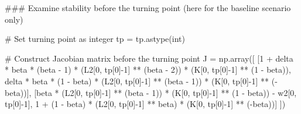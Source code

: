 \documentclass[
  letterpaper,
  DIV=11,
  numbers=noendperiod]{scrreprt}
\newenvironment{Shaded}{\begin{snugshade}}{\end{snugshade}}
\newcommand{\BuiltInTok}[1]{\textcolor[rgb]{0.00,0.23,0.31}{#1}}
\newcommand{\CommentTok}[1]{\textcolor[rgb]{0.37,0.37,0.37}{#1}}
\newcommand{\DecValTok}[1]{\textcolor[rgb]{0.68,0.00,0.00}{#1}}
\newcommand{\NormalTok}[1]{\textcolor[rgb]{0.00,0.23,0.31}{#1}}
\newcommand{\OperatorTok}[1]{\textcolor[rgb]{0.37,0.37,0.37}{#1}}
\begin{document}
\begin{tcolorbox}[enhanced jigsaw, titlerule=0mm, breakable, bottomrule=.15mm, toprule=.15mm, colbacktitle=quarto-callout-note-color!10!white, rightrule=.15mm, toptitle=1mm, opacityback=0, left=2mm, coltitle=black, title=\textcolor{quarto-callout-note-color}{\faInfo}\hspace{0.5em}{Python code}, colframe=quarto-callout-note-color-frame, opacitybacktitle=0.6, leftrule=.75mm, bottomtitle=1mm, arc=.35mm, colback=white]

\begin{Shaded}
\begin{Highlighting}[]
\CommentTok{\#\#\# Examine stability before the turning point (here for the baseline scenario only)}

\CommentTok{\# Set turning point as integer}
\NormalTok{tp }\OperatorTok{=}\NormalTok{ tp.astype(}\BuiltInTok{int}\NormalTok{)  }

\CommentTok{\# Construct Jacobian matrix before the turning point }
\NormalTok{J }\OperatorTok{=}\NormalTok{ np.array([}
\NormalTok{    [}\DecValTok{1} \OperatorTok{+}\NormalTok{ delta }\OperatorTok{*}\NormalTok{ beta }\OperatorTok{*}\NormalTok{ (beta }\OperatorTok{{-}} \DecValTok{1}\NormalTok{) }\OperatorTok{*}\NormalTok{ (L2[}\DecValTok{0}\NormalTok{, tp[}\DecValTok{0}\NormalTok{]}\OperatorTok{{-}}\DecValTok{1}\NormalTok{] }\OperatorTok{**}\NormalTok{ (beta }\OperatorTok{{-}} \DecValTok{2}\NormalTok{)) }\OperatorTok{*}\NormalTok{ (K[}\DecValTok{0}\NormalTok{, tp[}\DecValTok{0}\NormalTok{]}\OperatorTok{{-}}\DecValTok{1}\NormalTok{] }\OperatorTok{**}\NormalTok{ (}\DecValTok{1} \OperatorTok{{-}}\NormalTok{ beta)),}
\NormalTok{     delta }\OperatorTok{*}\NormalTok{ beta }\OperatorTok{*}\NormalTok{ (}\DecValTok{1} \OperatorTok{{-}}\NormalTok{ beta) }\OperatorTok{*}\NormalTok{ (L2[}\DecValTok{0}\NormalTok{, tp[}\DecValTok{0}\NormalTok{]}\OperatorTok{{-}}\DecValTok{1}\NormalTok{] }\OperatorTok{**}\NormalTok{ (beta }\OperatorTok{{-}} \DecValTok{1}\NormalTok{)) }\OperatorTok{*}\NormalTok{ (K[}\DecValTok{0}\NormalTok{, tp[}\DecValTok{0}\NormalTok{]}\OperatorTok{{-}}\DecValTok{1}\NormalTok{] }\OperatorTok{**}\NormalTok{ (}\OperatorTok{{-}}\NormalTok{beta))],}
\NormalTok{    [beta }\OperatorTok{*}\NormalTok{ (L2[}\DecValTok{0}\NormalTok{, tp[}\DecValTok{0}\NormalTok{]}\OperatorTok{{-}}\DecValTok{1}\NormalTok{] }\OperatorTok{**}\NormalTok{ (beta }\OperatorTok{{-}} \DecValTok{1}\NormalTok{)) }\OperatorTok{*}\NormalTok{ (K[}\DecValTok{0}\NormalTok{, tp[}\DecValTok{0}\NormalTok{]}\OperatorTok{{-}}\DecValTok{1}\NormalTok{] }\OperatorTok{**}\NormalTok{ (}\DecValTok{1} \OperatorTok{{-}}\NormalTok{ beta)) }\OperatorTok{{-}}\NormalTok{ w2[}\DecValTok{0}\NormalTok{, tp[}\DecValTok{0}\NormalTok{]}\OperatorTok{{-}}\DecValTok{1}\NormalTok{],}
     \DecValTok{1} \OperatorTok{+}\NormalTok{ (}\DecValTok{1} \OperatorTok{{-}}\NormalTok{ beta) }\OperatorTok{*}\NormalTok{ (L2[}\DecValTok{0}\NormalTok{, tp[}\DecValTok{0}\NormalTok{]}\OperatorTok{{-}}\DecValTok{1}\NormalTok{] }\OperatorTok{**}\NormalTok{ beta) }\OperatorTok{*}\NormalTok{ (K[}\DecValTok{0}\NormalTok{, tp[}\DecValTok{0}\NormalTok{]}\OperatorTok{{-}}\DecValTok{1}\NormalTok{] }\OperatorTok{**}\NormalTok{ (}\OperatorTok{{-}}\NormalTok{beta))]}
\NormalTok{])}


\end{Highlighting}
\end{Shaded}
\end{tcolorbox}
\end{document}
